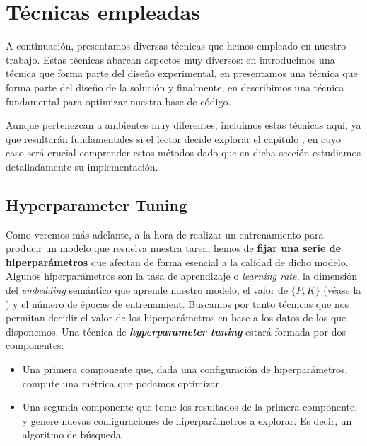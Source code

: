 \section{Técnicas empleadas}

A continuación, presentamos diversas técnicas que hemos empleado en nuestro trabajo. Estas técnicas abarcan aspectos muy diversos: en  introducimos una técnica que forma parte del diseño experimental, en  presentamos una técnica que forma parte del diseño de la solución y finalmente, en  describimos una técnica fundamental para optimizar nuestra base de código.

Aunque pertenezcan a ambientes muy diferentes, incluimos estas técnicas aquí, ya que resultarán fundamentales si el lector decide explorar el capítulo , en cuyo caso será crucial comprender estos métodos dado que en dicha sección estudiamos detalladamente su implementación.

\subsection{Hyperparameter Tuning} \label{isec:hptuning_kfold_cross_validation}

Como veremos más adelante, a la hora de realizar un entrenamiento para producir un modelo que resuelva nuestra tarea, hemos de \textbf{fijar una serie de hiperparámetros} que afectan de forma esencial a la calidad de dicho modelo. Algunos hiperparámetros son la tasa de aprendizaje o \textit{learning rate}, la dimensión del \textit{embedding} semántico que aprende nuestro modelo, el valor de $\{P, K\}$ (véase la ) y el número de épocas de entrenamient. Buscamos por tanto técnicas que nos permitan decidir el valor de los hiperparámetros en base a los datos de los que disponemos. Una técnica de \textbf{\textit{hyperparameter tuning}} estará formada por dos componentes:

\begin{itemize}
    \item Una primera componente que, dada una configuración de hiperparámetros, compute una métrica que podamos optimizar.
    \item Una segunda componente que tome los resultados de la primera componente, y genere nuevas configuraciones de hiperparámetros a explorar. Es decir, un algoritmo de búsqueda.
\end{itemize}

